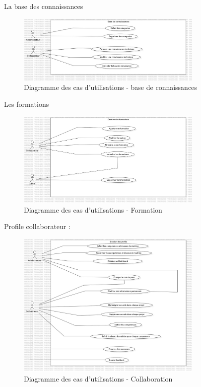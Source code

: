 \documentclass{article}
\begin{document}
                \FloatBarrier
                
                La base des connaissances
                \begin{figure}[h!]
                    \centering
                    \includegraphics[width=0.8\textwidth]{assets/diagrammes/jpg/Model3!UseCaseDoc_2.jpg}
                    \caption{Diagramme des cas d'utilisations - base de connaissances}
                \end{figure}
                
                \FloatBarrier
                
                Les formations
                \begin{figure}[h!]
                    \centering
                    \includegraphics[width=0.8\textwidth]{assets/diagrammes/jpg/Model4!UseCaseFormation_3.jpg}
                    \caption{Diagramme des cas d'utilisations - Formation}
                \end{figure}
                
                \FloatBarrier
                
                Profile collaborateur :
                \begin{figure}[h!]
                    \centering
                    \includegraphics[width=0.8\textwidth]{assets/diagrammes/jpg/Model5!UseCaseCollab_4.jpg}
                    \caption{Diagramme des cas d'utilisations - Collaboration}
                \end{figure}
                
\end{document}
